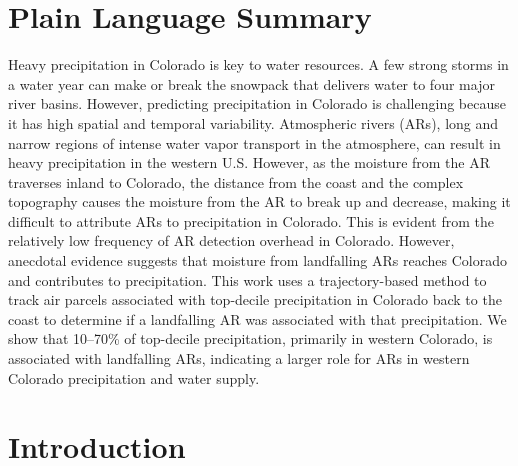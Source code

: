 \documentclass[draft]{agujournal2019}
\begin{document}
\section*{Plain Language Summary}
Heavy precipitation in Colorado is key to water resources. A few strong storms in a water year can make or break the snowpack that delivers water to four major river basins. However, predicting precipitation in Colorado is challenging because it has high spatial and temporal variability. Atmospheric rivers (ARs), long and narrow regions of intense water vapor transport in the atmosphere, can result in heavy precipitation in the western U.S. However, as the moisture from the AR traverses inland to Colorado, the distance from the coast and the complex topography causes the moisture from the AR to break up and decrease, making it difficult to attribute ARs to precipitation in Colorado. This is evident from the relatively low frequency of AR detection overhead in Colorado. However, anecdotal evidence suggests that moisture from landfalling ARs reaches Colorado and contributes to precipitation. This work uses a trajectory-based method to track air parcels associated with top-decile precipitation in Colorado back to the coast to determine if a landfalling AR was associated with that precipitation. We show that 10–70\% of top-decile precipitation, primarily in western Colorado, is associated with landfalling ARs, indicating a larger role for ARs in western Colorado precipitation and water supply.

%
%

\section{Introduction}
\label{intro}
\end{document}
